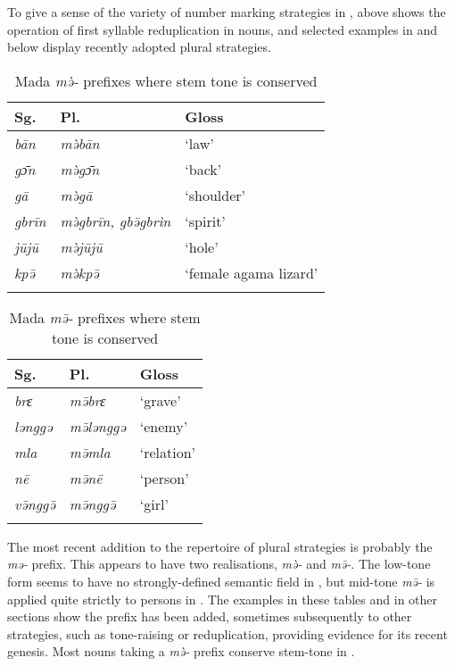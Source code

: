 \documentclass[output=paper]{langsci/langscibook}
\begin{document}
To give a sense of the variety of number marking strategies in ,  above shows the operation of first syllable reduplication in  nouns, and selected examples in  and  below display recently adopted plural strategies.

\begin{table} 
\caption{Mada \textit{mə̀-} prefixes where stem tone is conserved}
\label{extab:nomaffplat:41}
\begin{tabularx}{\textwidth}{XXX}
\lsptoprule
  {Sg.}  	&       {Pl.} 	&         Gloss\\
  \midrule
\itshape bān 	& \itshape mə̀bān 	& ‘law’\\
\itshape gɔ̄n 	& \itshape mə̀gɔ̄n 	& ‘back’\\
\itshape gā 	& \itshape mə̀gā 	& ‘shoulder’\\
\itshape gbrīn 	& \itshape mə̀gbrīn, gbə̄gbrìn 	& ‘spirit’\\
\itshape jūjū 	& \itshape mə̀jūjū & ‘hole’\\
\itshape kpə̄ 	& \itshape mə̀kpə̄ 	& ‘female agama lizard’\\
 \lspbottomrule
\end{tabularx}
\end{table}

\begin{table} 
\caption{Mada \textit{mə̄-} prefixes where stem tone is conserved}
\label{extab:nomaffplat:42}
\begin{tabularx}{\textwidth}{XXX}
\lsptoprule
 Sg.     	&    Pl.  	&       Gloss\\
\midrule
\itshape brɛ 	& \itshape mə̄brɛ 	& ‘grave’\\
\itshape lənggə 	& \itshape mə̄lənggə 	& ‘enemy’\\
\itshape mla 	& \itshape mə̄mla 	& ‘relation’\\
\itshape n\=e 	& \itshape mə̄n\=e   & ‘person’\\
\itshape və̄nggə̄ 	& \itshape mə̄nggə̄  	& ‘girl’\\
\lspbottomrule
\end{tabularx}
\end{table}


The most recent addition to the  repertoire of plural strategies is probably the \textit{mə-} prefix. This appears to have two realisations, \textit{mə̀-} and \textit{mə̄-}. The low-tone form seems to have no strongly-defined semantic field in , but mid-tone \textit{mə̄-} is applied quite strictly to persons in . The examples in these tables and in other sections show the prefix has been added, sometimes subsequently to other strategies, such as tone-raising or reduplication, providing evidence for its recent genesis. Most nouns taking a \textit{mə̀-} prefix conserve stem-tone in .
\end{document}
